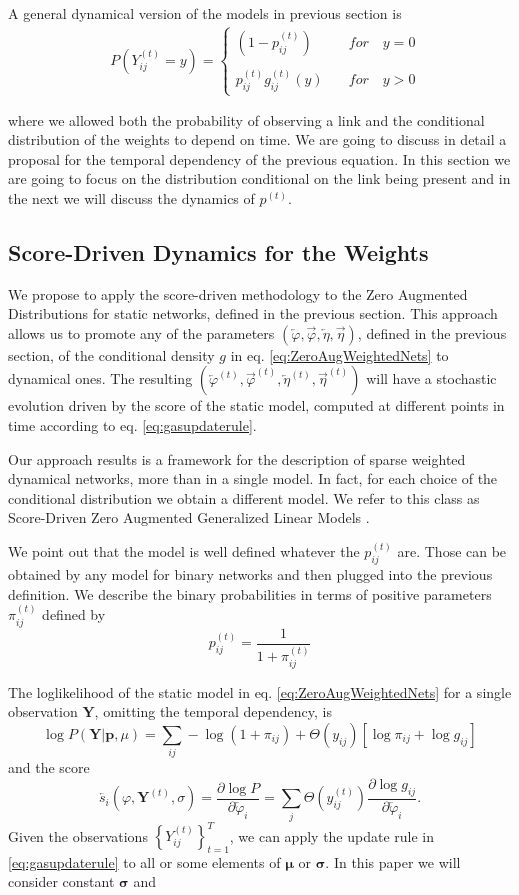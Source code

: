 \documentclass[a4paper,12pt]{article}
\newcommand{\tonde}[1]{\left(#1\right)}
\newcommand{\pt}[1]{\left(#1\right)}
\newcommand{\quadre}[1]{\left[#1\right]}
\newcommand{\graffe}[1]{\left\{#1\right\}}
\newcommand{\be}{\begin{equation}}
\newcommand{\ee}{\end{equation}}
\newcommand{\ba}{\begin{eqnarray}}
\newcommand{\ea}{\end{eqnarray}}
\newcommand{\Y}{{\mathbf{Y}}}
\newcommand{\Yt}{{\mathbf{Y}^{\tonde{t}}}}
\newcommand{\Yijt}{{Y_{ij}^{\tonde{t}}}}
\newcommand{\et}{^{\tonde{t}}}
\newcommand{\uij}{_{ij}}
\newcommand{\wpar}{\varphi}
\newcommand{\iwpar}{{\overleftarrow{\wpar}}}
\newcommand{\owpar}{{\overrightarrow{\wpar}}}
\newcommand{\wparvar}{\eta}
\newcommand{\iwparvar}{{\overleftarrow{\wparvar}}}
\newcommand{\owparvar}{{\overrightarrow{\wparvar}}}
\begin{document}
A general dynamical version of the models in previous section is  
\ba\label{eq:ZeroAugWeightedNets_dyn}
&P\tonde{\Yijt  = y} =  \left\lbrace\begin{array}{ll} 
	\pt{1-p\uij\et }   \quad &for \quad y=0 \\
	\\
	p\uij\et  g\uij\et\tonde{y}  \quad &for \quad y>0 \end{array}\right.  \nonumber\\
&\nonumber\\
\ea
where we allowed both the probability of observing a link and the conditional distribution of the weights to depend on time. We are going to discuss in detail a proposal for the temporal dependency of the previous equation. In this section we are going to focus on the distribution conditional on the link being present and in the next we will discuss the dynamics of $p\et$. 

\subsection{Score-Driven Dynamics for the Weights}\label{sec:sd_cond_distr}
We propose to apply the score-driven methodology to the Zero Augmented Distributions for static networks, defined in the previous section. This approach allows us to promote any of the parameters $\pt{\iwpar, \owpar, \iwparvar, \owparvar}$, defined in the previous section, of the conditional density $g$ in eq. \eqref{eq:ZeroAugWeightedNets} to dynamical ones. The resulting $\pt{\iwpar\et, \owpar\et, \iwparvar\et, \owparvar\et}$ will have a stochastic evolution driven by the score of the static model, computed at different points in time according to eq. \eqref{eq:gasupdaterule}.  

Our approach results is a framework for the description of sparse weighted dynamical networks, more than in a single model. In fact, for each choice of the conditional distribution we obtain a different model. We refer to this class as Score-Driven Zero Augmented Generalized Linear Models .

We point out that the  model is well defined whatever the $p\uij\et$ are. Those can be obtained by any model for binary networks and then plugged into the previous definition. We describe the binary probabilities in terms of positive parameters $\pi\uij\et $ defined by 
$$p\et\uij = \frac{1}{1 + \pi\et\uij} $$ 

The loglikelihood of the static model in eq. \eqref{eq:ZeroAugWeightedNets} for a single observation $\Y$, omitting the temporal dependency, is
\be
\log{P\tonde{\Y \vert \mathbf{p} ,  \mu  } }  = \sum\uij -\log{\tonde{1 + \pi\uij}} +\Theta\tonde{y\uij} \quadre{\log{\pi\uij} + \log{g\uij} } 
\ee
and the score
\be
\overleftarrow{s_i}\pt{\varphi,\Yt,\sigma} = \frac{\partial \log P}{\partial \iwpar_i} = \sum_{j} \Theta\pt{y\uij\et} \frac{\partial \log g\uij}{\partial \iwpar_i}.
\ee
Given the observations $\graffe{\Yijt}_{t=1}^{T}$,  we can apply the update rule in \eqref{eq:gasupdaterule} to all or some elements of $\boldsymbol{\mu}$ or $ \boldsymbol{\sigma}$. In this paper we will consider constant $\boldsymbol{\sigma}$ and 
\end{document}
